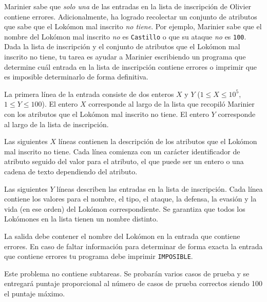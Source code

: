 \documentclass{oci}
\begin{document}
\begin{problemDescription}
Marinier sabe que \emph{solo una} de las entradas en la lista de inscripción
de Olivier contiene errores.
Adicionalmente, ha logrado recolectar un conjunto de atributos que sabe que el Lokómon
mal inscrito \emph{no tiene}.
Por ejemplo, Marinier sabe que el nombre del Lokómon mal inscrito \emph{no} es \texttt{Castillo}
o que su ataque \emph{no} es \texttt{100}.
Dada la lista de inscripción y el conjunto de atributos que el Lokómon
mal inscrito no tiene, tu tarea es ayudar a Marinier escribiendo un programa que determine
cuál entrada en la lista de inscripción contiene errores o imprimir que es imposible
determinarlo de forma definitiva.
\end{problemDescription}

\begin{inputDescription}
La primera línea de la entrada consiste de dos enteros $X$ y $Y$
($1 \leq X \leq 10^5$, $1 \leq Y \leq 100$).
El entero $X$ corresponde al largo de la lista que recopiló Marinier con los atributos
que el Lokómon mal inscrito no tiene.
El entero $Y$ corresponde al largo de la lista de inscripción.

Las siguientes $X$ líneas contienen la descripción de los atributos que el Lokómon mal
inscrito no tiene.
Cada línea comienza con un carácter identificador de atributo seguido del valor para el atributo,
el que puede ser un entero o una cadena de texto dependiendo del atributo.

Las siguientes $Y$ líneas describen las entradas en la lista de inscripción.
Cada línea contiene los valores para el nombre, el tipo, el ataque, la defensa,
la evasión y la vida (en ese orden) del Lokómon correspondiente.
Se garantiza que todos los Lokómones en la lista tienen un nombre distinto.
\end{inputDescription}

\begin{outputDescription}
La salida debe contener el nombre del Lokómon en la entrada que contiene errores.
En caso de faltar información para determinar de forma exacta la entrada que contiene errores
tu programa debe imprimir \texttt{IMPOSIBLE}.
\end{outputDescription}

\begin{scoreDescription}
Este problema no contiene subtareas.
Se probarán varios casos de prueba y se entregará puntaje proporcional al número
de casos de prueba correctos siendo 100 el puntaje máximo.
\end{scoreDescription}

\begin{sampleDescription}
\end{sampleDescription}
\end{document}
